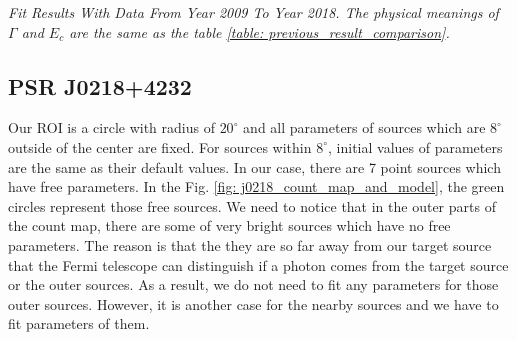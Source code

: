 \documentclass[12pt]{report}
\newcommand{\mycaption}[1]{\caption{\textit{\footnotesize #1}}}
\begin{document}
          \begin{table}[!ht]
            \centering
            \mycaption{Fit Results With Data From Year 2009 To Year 2018. The physical meanings of 
            $\Gamma$ and $E_c$ are the same as the table \ref{table: previous_result_comparison}.}
            \label{table: 2018_fit_data}
          \end{table}
          \vspace{1cm}            
            

        \subsection{PSR J0218+4232}
          \label{j0218}
          Our ROI is a circle with radius of $20^\circ$ and all parameters of sources which are $8^\circ$ outside 
          of the center are fixed. For sources within $8^\circ$, initial values of parameters are the same as
          their default values.
          In our case, there are 7 point sources which have free parameters. In the Fig.
          \ref{fig: j0218_count_map_and_model}, the green circles represent those free sources. We need to notice 
          that in the outer parts of the count map, there are some of very 
          bright sources which have no free parameters. The reason is that the they are so far away from our target source
          that the Fermi telescope can distinguish if a photon comes from the target source or the outer sources.
          As a result, we do not need to fit any parameters for those outer sources. 
          However, it is another case for the nearby sources and we have to fit parameters of them.
          
\end{document}
